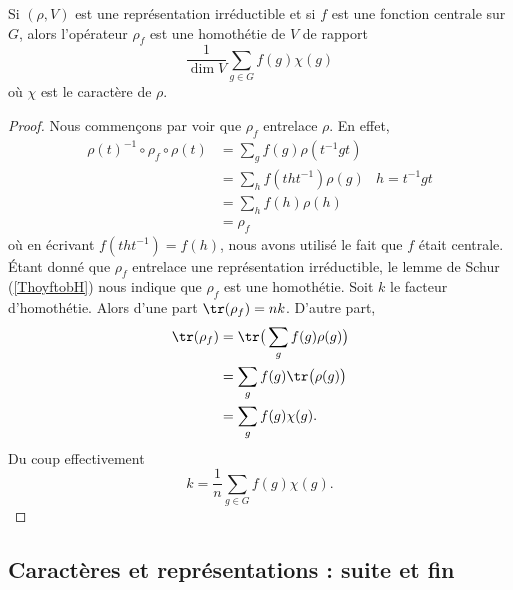 \begin{proposition}  \label{PropEAXkAY}
    Si \( (\rho,V)\) est une représentation irréductible et si \( f\) est une fonction centrale sur \( G\), alors l'opérateur \( \rho_f\) est une homothétie de \( V\) de rapport
    \begin{equation}
        \frac{1}{ \dim V }\sum_{g\in G}f(g)\chi(g)
    \end{equation}
    où \( \chi\) est le caractère de \( \rho\).
\end{proposition}

\begin{proof}
    Nous commençons par voir que \( \rho_f\) entrelace \( \rho\). En effet,
    \begin{subequations}
        \begin{align}
            \rho(t)^{-1}\circ\rho_f\circ\rho(t)&=\sum_gf(g)\rho(t^{-1}gt)\\
            &=\sum_hf(tht^{-1})\rho(g)      & h=t^{-1}gt\\
            &=\sum_hf(h)\rho(h)\\
            &=\rho_f
        \end{align}
    \end{subequations}
    où en écrivant \( f(tht^{-1})=f(h)\), nous avons utilisé le fait que \( f\) était centrale. Étant donné que \( \rho_f\) entrelace une représentation irréductible, le lemme de Schur (\ref{ThoyftobH}) nous indique que \( \rho_f\) est une homothétie. Soit \( k\) le facteur d'homothétie. Alors d'une part \( \tr(\rho_f)=nk\). D'autre part,
    \begin{subequations}
        \begin{align}
            \tr(\rho_f)&=\tr\big( \sum_gf(g)\rho(g) \big)\\
            &=\sum_gf(g)\tr\big( \rho(g) \big)\\
            &=\sum_gf(g)\chi(g).
        \end{align}
    \end{subequations}
    Du coup effectivement
    \begin{equation}
        k=\frac{1}{ n }\sum_{g\in G}f(g)\chi(g).
    \end{equation}
\end{proof}

\subsection{Caractères et représentations : suite et fin}

